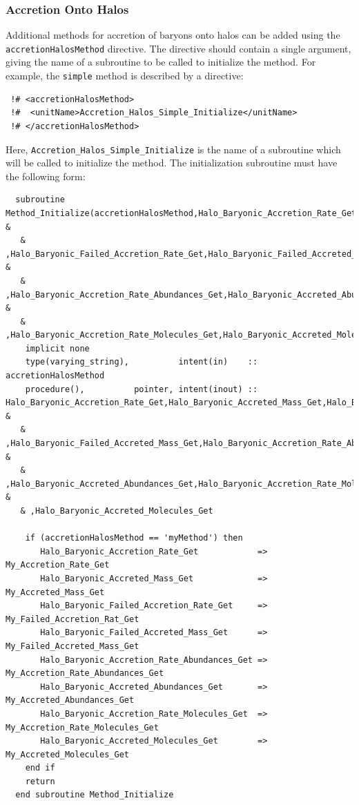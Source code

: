 \subsubsection{Accretion Onto Halos}

Additional methods for accretion of baryons onto halos can be added using the {\tt accretionHalosMethod} directive. The directive should contain a single argument, giving the name of a subroutine to be called to initialize the method. For example, the {\tt simple} method is described by a directive:
\begin{verbatim}
 !# <accretionHalosMethod>
 !#  <unitName>Accretion_Halos_Simple_Initialize</unitName>
 !# </accretionHalosMethod>
\end{verbatim}
Here, {\tt Accretion\_Halos\_Simple\_Initialize} is the name of a subroutine which will be called to initialize the method. The initialization subroutine must have the following form:
\begin{verbatim}
  subroutine Method_Initialize(accretionHalosMethod,Halo_Baryonic_Accretion_Rate_Get,Halo_Baryonic_Accreted_Mass_Get &
   & ,Halo_Baryonic_Failed_Accretion_Rate_Get,Halo_Baryonic_Failed_Accreted_Mass_Get &
   & ,Halo_Baryonic_Accretion_Rate_Abundances_Get,Halo_Baryonic_Accreted_Abundances_Get, &
   & ,Halo_Baryonic_Accretion_Rate_Molecules_Get,Halo_Baryonic_Accreted_Molecules_Get)
    implicit none
    type(varying_string),          intent(in)    :: accretionHalosMethod
    procedure(),          pointer, intent(inout) :: Halo_Baryonic_Accretion_Rate_Get,Halo_Baryonic_Accreted_Mass_Get,Halo_Baryonic_Failed_Accretion_Rate_Get &
   & ,Halo_Baryonic_Failed_Accreted_Mass_Get,Halo_Baryonic_Accretion_Rate_Abundances_Get &
   & ,Halo_Baryonic_Accreted_Abundances_Get,Halo_Baryonic_Accretion_Rate_Molecules_Get &
   & ,Halo_Baryonic_Accreted_Molecules_Get
    
    if (accretionHalosMethod == 'myMethod') then
       Halo_Baryonic_Accretion_Rate_Get            => My_Accretion_Rate_Get
       Halo_Baryonic_Accreted_Mass_Get             => My_Accreted_Mass_Get
       Halo_Baryonic_Failed_Accretion_Rate_Get     => My_Failed_Accretion_Rat_Get
       Halo_Baryonic_Failed_Accreted_Mass_Get      => My_Failed_Accreted_Mass_Get
       Halo_Baryonic_Accretion_Rate_Abundances_Get => My_Accretion_Rate_Abundances_Get
       Halo_Baryonic_Accreted_Abundances_Get       => My_Accreted_Abundances_Get
       Halo_Baryonic_Accretion_Rate_Molecules_Get  => My_Accretion_Rate_Molecules_Get
       Halo_Baryonic_Accreted_Molecules_Get        => My_Accreted_Molecules_Get
    end if
    return
  end subroutine Method_Initialize
\end{verbatim}
